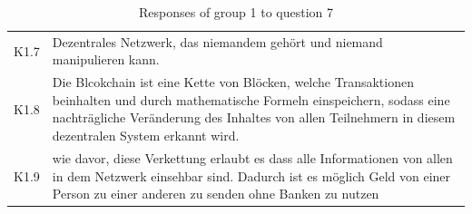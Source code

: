 \begin{table}[H]
\begin{tabularx}{\textwidth}{r|X}
         K1.7 & Dezentrales Netzwerk, das niemandem gehört und niemand manipulieren kann.\\
         K1.8 & Die Blcokchain ist eine Kette von Blöcken, welche Transaktionen beinhalten und durch mathematische Formeln einspeichern, sodass eine nachträgliche Veränderung des Inhaltes von allen Teilnehmern in diesem dezentralen System erkannt wird. \\
         K1.9 & wie davor, diese Verkettung erlaubt es dass alle Informationen von allen in dem Netzwerk einsehbar sind. Dadurch ist es möglich Geld von einer Person zu einer anderen zu senden ohne Banken zu nutzen\\
    \end{tabularx}
    \caption{Responses of group 1 to question 7}
    \label{tab:Video7}
\end{table}


